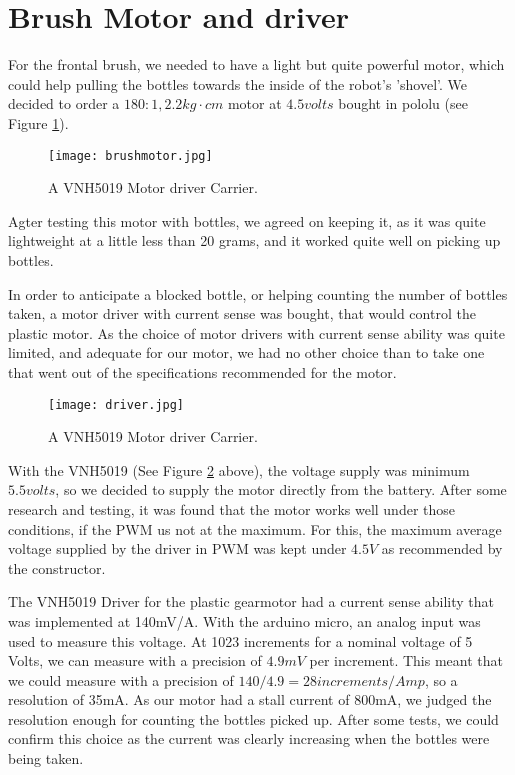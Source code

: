 \section{Brush Motor and driver}

For the frontal brush, we needed to have a light but quite powerful motor, which could help pulling the bottles towards the inside of the robot's 'shovel'. We decided to order a $180:1, 2.2 kg\cdot cm$ motor at $4.5 volts$ bought in pololu (see Figure \ref{fig:brushmotor}).

\begin{figure}[H]
  \centering
  \texttt{[image: brushmotor.jpg]}
  \caption{A VNH5019 Motor driver Carrier.}
\label{fig:brushmotor}
\end{figure}

Agter testing this motor with bottles, we agreed on keeping it, as it was quite lightweight at a little less than 20 grams, and it worked quite well on picking up bottles. 

In order to anticipate a blocked bottle, or helping counting the number of bottles taken, a motor driver with current sense was bought, that would control the plastic motor. As the choice of motor drivers with current sense ability was quite limited, and adequate for our motor, we had no other choice than to take one that went out of the specifications recommended for the motor.

\begin{figure}[H]
  \centering
  \texttt{[image: driver.jpg]}
  \caption{A VNH5019 Motor driver Carrier.}
\label{fig:driver}
\end{figure}

With the VNH5019 (See Figure \ref{fig:driver} above), the voltage supply was minimum $5.5 volts$, so we decided to supply the motor directly from the battery. After some research and testing, it was found that the motor works well under those conditions, if the PWM us not at the maximum. For this, the maximum average voltage supplied by the driver in PWM was kept under $4.5 V$ as recommended by the constructor.

The VNH5019 Driver for the plastic gearmotor had a current sense ability that was implemented at 140mV/A. With the arduino micro, an analog input was used to measure this voltage. At 1023 increments for a nominal voltage of 5 Volts, we can measure with a precision of $4.9 mV$ per increment. This meant that we could measure with a precision of $140/4.9 = 28 increments / Amp$, so a resolution of 35mA. As our motor had a stall current of 800mA, we judged the resolution enough for counting the bottles picked up. After some tests, we could confirm this choice as the current was clearly increasing when the bottles were being taken.

